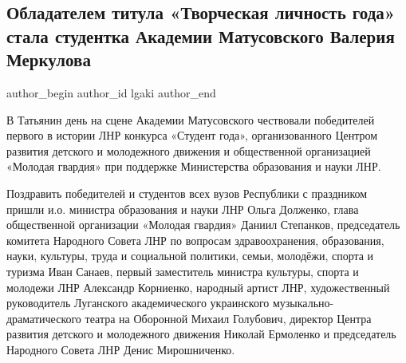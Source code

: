  
 
 
 
 
 
\subsection{Обладателем титула «Творческая личность года» стала студентка Академии Матусовского Валерия Меркулова}
\label{sec:26_01_2022.stz.edu.lnr.lgaki.1.tvorcheskaja_lichnost_goda}
 
\ifcmt
 author_begin
   author_id lgaki
 author_end
\fi

В Татьянин день на сцене Академии Матусовского чествовали победителей первого в
истории ЛНР конкурса «Студент года», организованного Центром развития детского
и молодежного движения и общественной организацией «Молодая гвардия» при
поддержке Министерства образования и науки ЛНР.


Поздравить победителей и студентов всех вузов Республики с праздником пришли
и.о. министра образования и науки ЛНР Ольга Долженко, глава общественной
организации «Молодая гвардия» Даниил Степанков, председатель комитета Народного
Совета ЛНР по вопросам здравоохранения, образования, науки, культуры, труда и
социальной политики, семьи, молодёжи, спорта и туризма Иван Санаев, первый
заместитель министра культуры, спорта и молодежи ЛНР Александр Корниенко,
народный артист ЛНР, художественный руководитель Луганского академического
украинского музыкально-драматического театра на Оборонной Михаил Голубович,
директор Центра развития детского и молодежного движения Николай Ермоленко и
председатель Народного Совета ЛНР Денис Мирошниченко.



